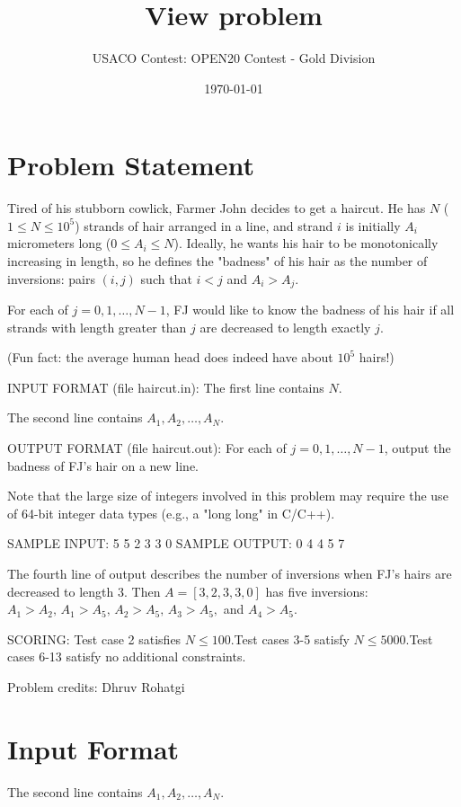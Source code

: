 \documentclass[12pt]{article}
\title{View problem}
\author{USACO Contest: OPEN20 Contest - Gold Division}
\date{\today}
\begin{document}
\maketitle

\section*{Problem Statement}

Tired of his stubborn cowlick, Farmer John decides to get a haircut. He has $N$
($1\le N\le 10^5$) strands of hair arranged in a line, and strand $i$ is
initially $A_i$ micrometers long ($0\le A_i\le N$). Ideally, he wants his hair
to be monotonically increasing in length, so he defines the "badness" of his
hair as the number of inversions: pairs $(i,j)$ such that $i < j$ and
$A_i > A_j$.

For each of $j=0,1,\ldots,N-1$, FJ would like to know the badness of his hair if
all strands with length greater than $j$ are decreased to length exactly $j$.

(Fun fact: the average human head does indeed have about $10^5$ hairs!)

INPUT FORMAT (file haircut.in):
The first line contains $N$.

The second line contains $A_1,A_2,\ldots,A_N.$

OUTPUT FORMAT (file haircut.out):
For each of $j=0,1,\ldots,N-1$, output the badness of FJ's hair on a new line.

Note that the large size of integers involved in this problem may require the
use of 64-bit integer data types (e.g., a "long long" in C/C++).

SAMPLE INPUT:
5
5 2 3 3 0
SAMPLE OUTPUT: 
0
4
4
5
7

The fourth line of output describes the number of inversions when FJ's hairs are
decreased to length 3. Then $A=[3,2,3,3,0]$ has five inversions: 
$A_1>A_2,\,A_1>A_5,\,A_2>A_5,\,A_3>A_5,$ and $A_4>A_5$.

SCORING:
Test case 2 satisfies $N\le 100.$Test cases 3-5 satisfy $N\le 5000.$Test cases 6-13 satisfy no additional constraints.


Problem credits: Dhruv Rohatgi



\section*{Input Format}
The second line contains $A_1,A_2,\ldots,A_N.$
\end{document}
